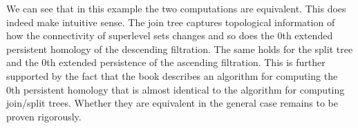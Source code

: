 We can see that in this example the two computations are equivalent. This does indeed make intuitive sense. The join tree captures topological information of how the connectivity of superlevel sets changes and so does the 0th extended persistent homology of the descending filtration. The same holds for the split tree and the 0th extended persistence of the ascending filtration. This is further supported by the fact that the book \cite[p. 158]{comp-topo} describes an algorithm for computing the 0th persistent homology that is almost identical to the algorithm for computing join/split trees. Whether they are equivalent in the general case remains to be proven rigorously.





%
%
%





